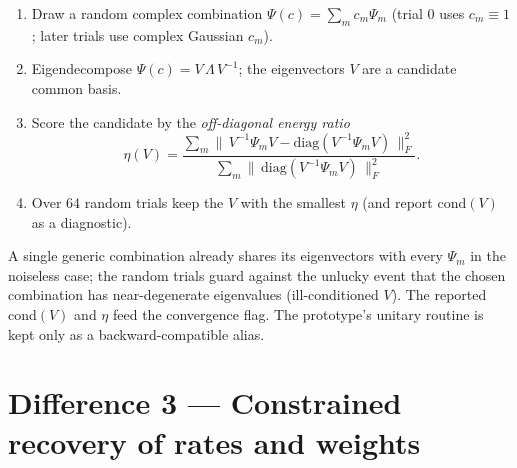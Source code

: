 \documentclass[11pt]{article}
\def\bm#1{#1}%
\theoremstyle{definition}
\begin{document}
\begin{enumerate}[leftmargin=2em, itemsep=1pt]
  \item Draw a random complex combination $\Psi(\bm c)=\sum_m c_m\Psi_m$
        (trial $0$ uses $c_m\equiv1$; later trials use complex Gaussian $c_m$).
  \item Eigendecompose $\Psi(\bm c)=V\,\Lambda\,V^{-1}$; the eigenvectors $V$ are a candidate
        common basis.
  \item Score the candidate by the \emph{off-diagonal energy ratio}
        \begin{equation}
        \eta(V)=\frac{\sum_m \big\|\,V^{-1}\Psi_m V - \mathrm{diag}(V^{-1}\Psi_m V)\,\big\|_F^2}
                     {\sum_m \big\|\,\mathrm{diag}(V^{-1}\Psi_m V)\,\big\|_F^2}.
        \end{equation}
  \item Over $64$ random trials keep the $V$ with the smallest $\eta$ (and report
        $\mathrm{cond}(V)$ as a diagnostic).
\end{enumerate}
A single generic combination already shares its eigenvectors with every $\Psi_m$ in the
noiseless case; the random trials guard against the unlucky event that the chosen combination
has near-degenerate eigenvalues (ill-conditioned $V$). The reported $\mathrm{cond}(V)$ and
$\eta$ feed the convergence flag. The prototype's unitary routine is kept only as a
backward-compatible alias.

\section{Difference 3 --- Constrained recovery of rates and weights}\label{sec:constrained}
\end{document}
